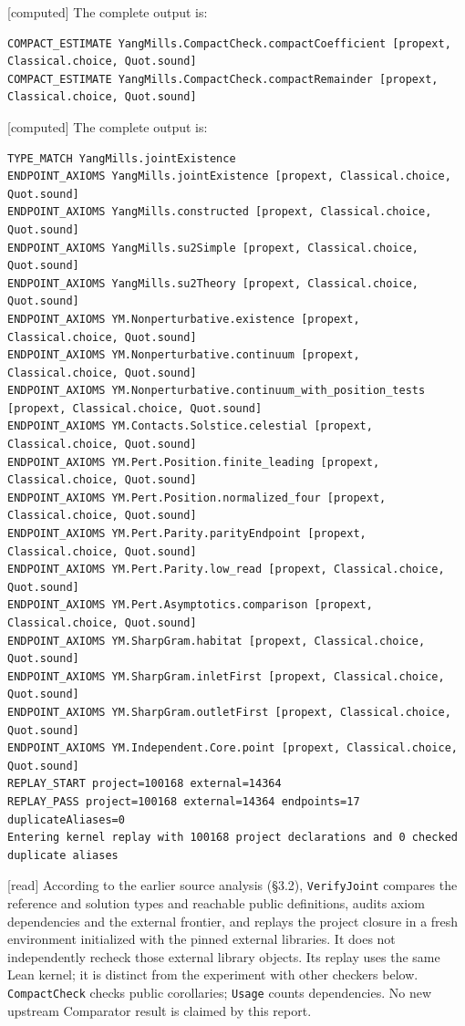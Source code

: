 \documentclass[11pt,a4paper]{article}
\theoremstyle{plain}
\theoremstyle{definition}
\theoremstyle{remark}
\numberwithin{equation}{section}
\newcommand{\st}[1]{\textsf{[#1]}}
\begin{document}
\st{computed} The complete  output is:
\begingroup\scriptsize
\begin{verbatim}
COMPACT_ESTIMATE YangMills.CompactCheck.compactCoefficient [propext, Classical.choice, Quot.sound]
COMPACT_ESTIMATE YangMills.CompactCheck.compactRemainder [propext, Classical.choice, Quot.sound]
\end{verbatim}
\endgroup
\st{computed} The complete  output is:
\begingroup\scriptsize
\begin{verbatim}
TYPE_MATCH YangMills.jointExistence
ENDPOINT_AXIOMS YangMills.jointExistence [propext, Classical.choice, Quot.sound]
ENDPOINT_AXIOMS YangMills.constructed [propext, Classical.choice, Quot.sound]
ENDPOINT_AXIOMS YangMills.su2Simple [propext, Classical.choice, Quot.sound]
ENDPOINT_AXIOMS YangMills.su2Theory [propext, Classical.choice, Quot.sound]
ENDPOINT_AXIOMS YM.Nonperturbative.existence [propext, Classical.choice, Quot.sound]
ENDPOINT_AXIOMS YM.Nonperturbative.continuum [propext, Classical.choice, Quot.sound]
ENDPOINT_AXIOMS YM.Nonperturbative.continuum_with_position_tests [propext, Classical.choice, Quot.sound]
ENDPOINT_AXIOMS YM.Contacts.Solstice.celestial [propext, Classical.choice, Quot.sound]
ENDPOINT_AXIOMS YM.Pert.Position.finite_leading [propext, Classical.choice, Quot.sound]
ENDPOINT_AXIOMS YM.Pert.Position.normalized_four [propext, Classical.choice, Quot.sound]
ENDPOINT_AXIOMS YM.Pert.Parity.parityEndpoint [propext, Classical.choice, Quot.sound]
ENDPOINT_AXIOMS YM.Pert.Parity.low_read [propext, Classical.choice, Quot.sound]
ENDPOINT_AXIOMS YM.Pert.Asymptotics.comparison [propext, Classical.choice, Quot.sound]
ENDPOINT_AXIOMS YM.SharpGram.habitat [propext, Classical.choice, Quot.sound]
ENDPOINT_AXIOMS YM.SharpGram.inletFirst [propext, Classical.choice, Quot.sound]
ENDPOINT_AXIOMS YM.SharpGram.outletFirst [propext, Classical.choice, Quot.sound]
ENDPOINT_AXIOMS YM.Independent.Core.point [propext, Classical.choice, Quot.sound]
REPLAY_START project=100168 external=14364
REPLAY_PASS project=100168 external=14364 endpoints=17 duplicateAliases=0
Entering kernel replay with 100168 project declarations and 0 checked duplicate aliases
\end{verbatim}
\endgroup

\st{read} According to the earlier source analysis (\S3.2), \texttt{VerifyJoint} compares the reference
and solution types and reachable public definitions, audits axiom dependencies and the external frontier,
and replays the project closure in a fresh environment initialized with the pinned external libraries.
It does not independently recheck those external library objects. Its replay uses the same Lean kernel;
it is distinct from the experiment with other checkers below. \texttt{CompactCheck} checks public corollaries;
\texttt{Usage} counts dependencies. No new upstream Comparator result is claimed by this report.
\end{document}
